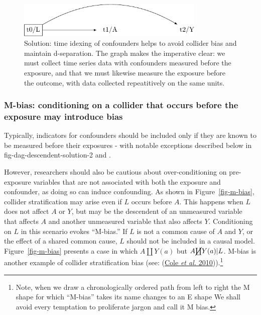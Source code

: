 \documentclass[
  singlecolumn]{article}
\begin{document}
\begin{figure}

{\centering \includegraphics[width=0.8\textwidth,height=\textheight]{causal-dags_files/figure-pdf/fig-dag-common-effect-solution-1.pdf}

}

\caption{\label{fig-dag-common-effect-solution}Solution: time idexing of
confounders helps to avoid collider bias and maintain d-separation. The
graph makes the imperative clear: we must collect time series data with
confounders measured before the exposure, and that we must likewise
measure the exposure before the outcome, with data collected
repeatitively on the same units.}

\end{figure}

\hypertarget{m-bias-conditioning-on-a-collider-that-occurs-before-the-exposure-may-introduce-bias}{%
\subsubsection{M-bias: conditioning on a collider that occurs before the
exposure may introduce
bias}\label{m-bias-conditioning-on-a-collider-that-occurs-before-the-exposure-may-introduce-bias}}

Typically, indicators for confounders should be included only if they
are known to be measured before their exposures - with notable
exceptions described below in fig-dag-descendent-solution-2 and .

However, researchers should also be cautious about over-conditioning on
pre-exposure variables that are not associated with both the exposure
and confounder, as doing so can induce confounding. As shown in
Figure~\ref{fig-m-bias}, collider stratification may arise even if \(L\)
occurs before \(A\). This happens when \(L\) does not affect \(A\) or
\(Y\), but may be the descendent of an unmeasured variable that affects
\(A\) and another unmeasured variable that also affects \(Y\).
Conditioning on \(L\) in this scenario evokes ``M-bias.'' If \(L\) is
not a common cause of \(A\) and \(Y\), or the effect of a shared common
cause, \(L\) should not be included in a causal model.
Figure~\ref{fig-m-bias} presents a case in which \(A \coprod Y(a)\) but
\(A \cancel{\coprod} Y(a)| L\). M-bias is another example of collider
stratification bias (see: (\protect\hyperlink{ref-cole2010}{Cole
\emph{et al.} 2010})).\footnote{Note, when we draw a chronologically
  ordered path from left to right the M shape for which ``M-bias'' takes
  its name changes to an E shape We shall avoid every temptation to
  proliferate jargon and call it M bias.}
\end{document}
